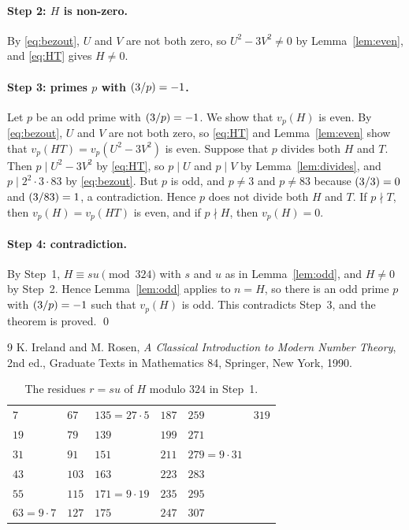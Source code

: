 \documentclass[11pt]{article}
\newcommand{\leg}[2]{\mathchoice{\biggl(\dfrac{#1}{#2}\biggr)}{(#1/#2)}{(#1/#2)}{(#1/#2)}}
\begin{document}
\paragraph{Step 2: $H$ is non-zero.} By \eqref{eq:bezout}, $U$ and $V$ are not both zero, so $U^2-3V^2\neq0$ by Lemma~\ref{lem:even}, and \eqref{eq:HT} gives $H\neq0$.

\paragraph{\texorpdfstring{Step 3: primes $p$ with $\leg{3}{p}=-1$.}{Step 3: inert primes.}} Let $p$ be an odd prime with $\leg{3}{p}=-1$. We show that $v_p(H)$ is even. By \eqref{eq:bezout}, $U$ and $V$ are not both zero, so \eqref{eq:HT} and Lemma~\ref{lem:even} show that $v_p(HT)=v_p(U^2-3V^2)$ is even. Suppose that $p$ divides both $H$ and $T$. Then $p\mid U^2-3V^2$ by \eqref{eq:HT}, so $p\mid U$ and $p\mid V$ by Lemma~\ref{lem:divides}, and $p\mid 2^{2}\cdot 3\cdot 83$ by \eqref{eq:bezout}. But $p$ is odd, and $p\neq3$ and $p\neq83$ because $\leg{3}{3}=0$ and $\leg{3}{83}=1$, a contradiction. Hence $p$ does not divide both $H$ and $T$. If $p\nmid T$, then $v_p(H)=v_p(HT)$ is even, and if $p\nmid H$, then $v_p(H)=0$.

\paragraph{Step 4: contradiction.} By Step~1, $H\equiv su\pmod{324}$ with $s$ and $u$ as in Lemma~\ref{lem:odd}, and $H\neq0$ by Step~2. Hence Lemma~\ref{lem:odd} applies to $n=H$, so there is an odd prime $p$ with $\leg{3}{p}=-1$ such that $v_p(H)$ is odd. This contradicts Step~3, and the theorem is proved.
\qed

\begin{thebibliography}{9}
 K. Ireland and M. Rosen, \emph{A Classical Introduction to Modern Number Theory}, 2nd ed., Graduate Texts in Mathematics 84, Springer, New York, 1990.
\end{thebibliography}

\begin{table}[ht]
\centering\footnotesize
\caption{The residues $r=su$ of $H$ modulo $324$ in Step~1.}\label{tab:res}
\begin{tabular}{llllll}
\hline
$7$ & $67$ & $135=27\cdot5$ & $187$ & $259$ & $319$\\
$19$ & $79$ & $139$ & $199$ & $271$ & \\
$31$ & $91$ & $151$ & $211$ & $279=9\cdot31$ & \\
$43$ & $103$ & $163$ & $223$ & $283$ & \\
$55$ & $115$ & $171=9\cdot19$ & $235$ & $295$ & \\
$63=9\cdot7$ & $127$ & $175$ & $247$ & $307$ & \\
\hline
\end{tabular}
\end{table}
\end{document}
